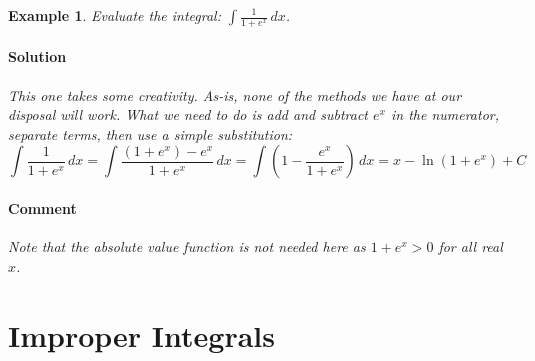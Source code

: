 \documentclass[letterpaper, 11pt, openany]{book}
\theoremstyle{mytheoremstyle}
\theoremstyle{myexamplestyle}
\newtheorem{example}{Example}[section]
\newenvironment{solution}{\paragraph{\sffamily \smaller \fontseries{b}\selectfont Solution}}{\hfill\faSquare}
\newenvironment{commentary}{\paragraph{\sffamily \smaller \fontseries{b}\selectfont Comment}}{}
\begin{document}
\begin{example}
    Evaluate the integral: $\displaystyle \int \frac{1}{1 + e^{x}} \, dx$.
    \begin{solution}
        This one takes some creativity. As-is, none of the methods we have at our disposal will work. What we need to do is add and subtract $e^{x}$ in the numerator, separate terms, then use a simple substitution:
        \[\int \frac{1}{1 + e^{x}} \, dx =  \int \frac{(1 + e^{x}) - e^{x}}{1 + e^{x}} \, dx = \int  \left( 1  - \frac{e^{x}}{1 + e^{x}} \right) \, dx = x - \ln \left( 1 + e^{x} \right) + C\]
    
    \end{solution}
    \begin{commentary}
        Note that the absolute value function is not needed here as $1 + e^{x} > 0$ for all real $x$.
    \end{commentary}
\end{example}

\section{Improper Integrals}
\setcounter{figure}{0}
\end{document}
